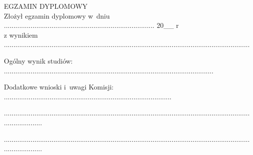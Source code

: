 \documentclass[../thesis.tex]{subfiles}
\begin{document}
\begin{flushleft}
\fontsize{12pt}{30pt}\selectfont
EGZAMIN DYPLOMOWY \\
Złożył egzamin dyplomowy w~dniu ............................................................................... 20\_\_ r \\

z wynikiem .................................................................................................................................

Ogólny wynik studiów: ..............................................................................................................

Dodatkowe wnioski i~uwagi Komisji: ........................................................................................

.....................................................................................................................................................

.....................................................................................................................................................

\end{flushleft}
\pagestyle{empty}
\cleardoublepage 
\end{document}
